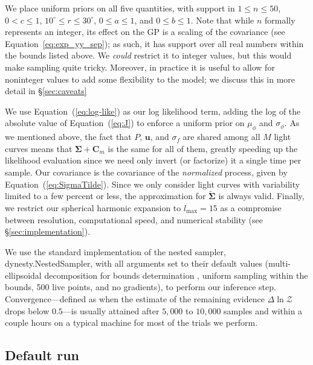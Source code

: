 \documentclass[modern]{aastex62}
\begin{document}
We place uniform priors on all five quantities, with support in
$1 \leq n \leq 50$, $0 < c \leq 1$,
$10^\circ \leq r \leq 30^\circ$,
$0 \leq a \leq 1$, and
$0 \leq b \leq 1$. Note that while $n$ formally represents an integer,
its effect on the GP is a scaling of the covariance (see Equation~\ref{eq:exp_yy_sep});
as such, it has support over all real numbers within the bounds listed
above. We \emph{could} restrict it to integer values, but this would make
sampling quite tricky. Moreover, in practice it is useful to allow for
noninteger values to add some flexibility to the model; we discuss this
in more detail in \S\ref{sec:caveats}

We use Equation~(\ref{eq:log-like}) as our log likelihood
term, adding the log of the absolute value of Equation~(\ref{eq:J}) to
enforce a uniform prior on $\mu_\phi$ and $\sigma_\phi$. As we mentioned
above, the fact that $P$, $\mathbf{u}$, and $\sigma_f$ are shared among
all $M$ light curves means that $\pmb{\Sigma} + \mathbf{C}_m$ is the same for all
of them, greatly speeding up the likelihood evaluation since we need
only invert (or factorize) it a single time per sample. Our
covariance is the covariance of the \emph{normalized} process,
given by Equation~(\ref{eq:SigmaTilde}). Since we only consider light curves
with variability limited to a few percent or less, the approximation for
$\tilde{\pmb{\Sigma}}$ is always valid. Finally, we restrict our spherical
harmonic expansion to $l_\mathrm{max} = 15$ as a compromise between
resolution, computational speed, and numerical stability (see \S\ref{sec:implementation}).

We use the standard implementation of the nested sampler,
\textsf{dynesty.NestedSampler}, with all arguments set to their
default values
(multi-ellipsoidal decomposition for bounds determination \citep{Feroz2009},
uniform sampling within the bounds,
500 live points,
and no gradients), to perform our inference step.
Convergence---defined as when the estimate of the remaining evidence $\Delta\ln \mathcal{Z}$ drops
below $0.5$---is usually attained after $5{,}000$ to $10{,}000$ samples and
within a couple hours on a typical machine for most of the trials we perform.

\subsection{Default run}
\label{sec:inference-default}
\end{document}
